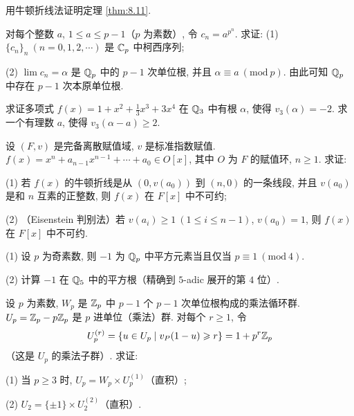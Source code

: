 \begin{Exercises}
\item 用牛顿折线法证明定理 \ref{thm:8.11}.

\item 对每个整数 $a$, $1\leqslant a\leqslant p-1$（$p$ 为素数）, 令 $c_n=a^{p^n}$. 求证: (1) $\{c_n\}_n\ (n=0,1,2,\cdots)$ 是 $\mathbb{C}_p$ 中柯西序列;

(2) $\lim c_n=\alpha$ 是 $\mathbb{Q}_p$ 中的 $p-1$ 次单位根, 并且 $\alpha\equiv a\ (\mathrm{mod}\ p)$. 由此可知 $\mathbb{Q}_p$ 中存在 $p-1$ 次本原单位根.

\item 求证多项式 $f(x)=1+x^2+\frac{1}{3}x^3+3x^4$ 在 $\mathbb{Q}_3$ 中有根 $\alpha$, 使得 $v_3(\alpha)=-2$. 求一个有理数 $a$, 使得 $v_3(\alpha-a)\geqslant 2$.

\item 设 $(F,v)$ 是完备离散赋值域, $v$ 是标准指数赋值. $f(x)=x^n+a_{n-1}x^{n-1}+\cdots+a_0\in O[x]$, 其中 $O$ 为 $F$ 的赋值环, $n\geqslant 1$. 求证:

(1) 若 $f(x)$ 的牛顿折线是从 $(0,v(a_0))$ 到 $(n,0)$ 的一条线段, 并且 $v(a_0)$ 是和 $n$ 互素的正整数, 则 $f(x)$ 在 $F[x]$ 中不可约;

(2) （Eisenstein 判别法）若 $v(a_i)\geqslant 1\ (1\leqslant i\leqslant n-1)$, $v(a_0)=1$, 则 $f(x)$ 在 $F[x]$ 中不可约.

\item (1) 设 $p$ 为奇素数, 则 $-1$ 为 $\mathbb{Q}_p$ 中平方元素当且仅当 $p\equiv 1\ (\mathrm{mod}\ 4)$.

(2) 计算 $-1$ 在 $\mathbb{Q}_5$ 中的平方根（精确到 $5$-adic 展开的第 $4$ 位）.

\item 设 $p$ 为素数, $W_p$ 是 $\mathbb{Z}_p$ 中 $p-1$ 个 $p-1$ 次单位根构成的乘法循环群. $U_p=\mathbb{Z}_p-p\mathbb{Z}_p$ 是 $p$ 进单位（乘法）群. 对每个 $r\geqslant 1$, 令
\[
  U_p^{(r)}=\{u\in U_p\mid v_P(1-u)\geqslant r\}=1+p^r\mathbb{Z}_p
\]
（这是 $U_p$ 的乘法子群）. 求证:

(1) 当 $p\geqslant 3$ 时, $U_p=W_p\times U_p^{(1)}$（直积）;

(2) $U_2=\{\pm 1\}\times U_2^{(2)}$（直积）.
\end{Exercises}
